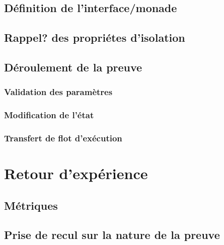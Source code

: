 		\subsection{Définition de l'interface/monade}
		\subsection{Rappel? des propriétes d'isolation}
		
		\subsection{Déroulement de la preuve}
			\subsubsection{Validation des paramètres}
			\subsubsection{Modification de l'état}
			\subsubsection{Transfert de flot d'exécution}

	\section{Retour d'expérience}
		\subsection{Métriques}
		\subsection{Prise de recul sur la nature de la preuve}
